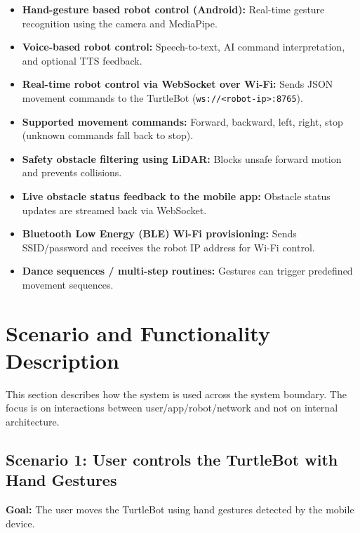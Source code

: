 \documentclass[11pt,a4paper]{article}
\begin{document}
\begin{itemize}[leftmargin=1.5cm]

	\item \textbf{Hand-gesture based robot control (Android):}
	Real-time gesture recognition using the camera and MediaPipe.

	\item \textbf{Voice-based robot control:}
	Speech-to-text, AI command interpretation, and optional TTS feedback.

	\item \textbf{Real-time robot control via WebSocket over Wi-Fi:}
	Sends JSON movement commands to the TurtleBot (\texttt{ws://<robot-ip>:8765}).

	\item \textbf{Supported movement commands:}
	Forward, backward, left, right, stop (unknown commands fall back to stop).

	\item \textbf{Safety obstacle filtering using LiDAR:}
	Blocks unsafe forward motion and prevents collisions.

	\item \textbf{Live obstacle status feedback to the mobile app:}
	Obstacle status updates are streamed back via WebSocket.

	\item \textbf{Bluetooth Low Energy (BLE) Wi-Fi provisioning:}
	Sends SSID/password and receives the robot IP address for Wi-Fi control.

	\item \textbf{Dance sequences / multi-step routines:}
	Gestures can trigger predefined movement sequences.

\end{itemize}

\newpage
\section{Scenario and Functionality Description}

This section describes how the system is used across the system boundary.
The focus is on interactions between user/app/robot/network and not on internal architecture.

\subsection{Scenario 1: User controls the TurtleBot with Hand Gestures}
\textbf{Goal:} The user moves the TurtleBot using hand gestures detected by the mobile device.
\end{document}
